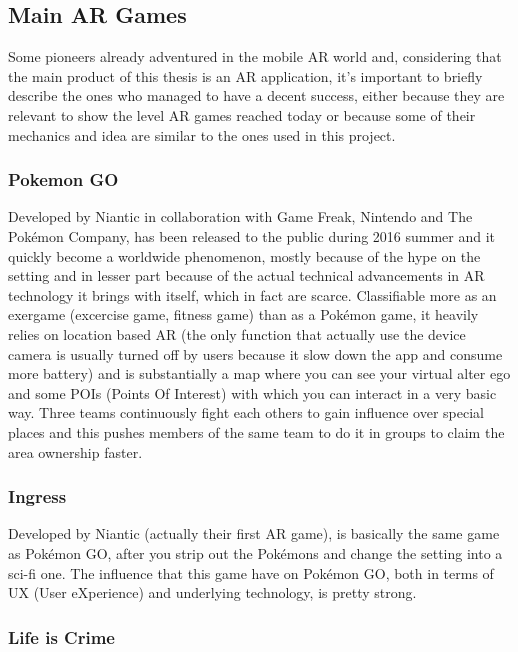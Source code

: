 		\subsection{Main AR Games}
		\label{soa:games}
		
			Some pioneers already adventured in the mobile AR world and, considering that the main product of this thesis is an AR application, it's important to briefly describe the ones who managed to have a decent success, either because they are relevant to show the level AR games reached today or because some of their mechanics and idea are similar to the ones used in this project.
		
			\subsubsection{Pokemon GO}
			
				Developed by Niantic in collaboration with Game Freak, Nintendo and The Pokémon Company, has been released to the public during 2016 summer and it quickly become a worldwide phenomenon, mostly because of the hype on the setting and in lesser part because of the actual technical advancements in AR technology it brings with itself, which in fact are scarce.
				Classifiable more as an exergame (excercise game, fitness game) than as a Pokémon game, it heavily relies on location based AR (the only function that actually use the device camera is usually turned off by users because it slow down the app and consume more battery) and is substantially a map where you can see your virtual alter ego and some POIs (Points Of Interest) with which you can interact in a very basic way.
				Three teams continuously fight each others to gain influence over special places and this pushes members of the same team to do it in groups to claim the area ownership faster.
			
			\subsubsection{Ingress}
			
				Developed by Niantic (actually their first AR game), is basically the same game as Pokémon GO, after you strip out the Pokémons and change the setting into a sci-fi one.
				The influence that this game have on Pokémon GO, both in terms of UX (User eXperience) and underlying technology, is pretty strong.
			
			\subsubsection{Life is Crime}
			

